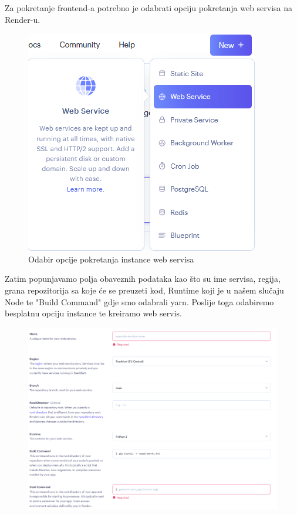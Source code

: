 				Za pokretanje frontend-a potrebno je odabrati opciju pokretanja web servisa na Render-u.
				\begin{figure}[H]
					\centering
					\includegraphics[width=\textwidth]{slike/render_web_service.png}
					\caption{Odabir opcije pokretanja instance web servisa}
					\label{fig: Render web service instance front}
				\end{figure}
				Zatim popunjavamo polja obaveznih podataka kao što su ime servisa, regija, grana repozitorija sa koje će se preuzeti kod, Runtime koji je u našem slučaju Node te "Build Command" gdje smo odabrali yarn. Poslije toga odabiremo besplatnu opciju instance te kreiramo web servis.
				\begin{figure}[H]
					\centering
					\includegraphics[width=\textwidth]{slike/create_web_service_part1.png}
					\label{fig: Render create web service part 1 front}
				\end{figure}
